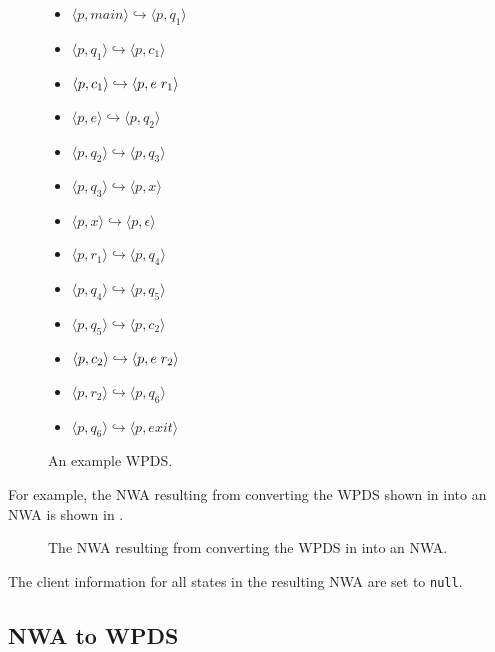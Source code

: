 \begin{figure}[t]
  \centering
    \begin{itemize}
      \centering
      \item{ $\langle p,main \rangle \hookrightarrow \langle p,q_1 \rangle$}
      \item{ $\langle p,q_1 \rangle \hookrightarrow \langle p,c_1 \rangle$}
      \item{ $\langle p,c_1 \rangle \hookrightarrow \langle p,e \hspace{.1cm} r_1 \rangle$}
      \item{ $\langle p,e \rangle \hookrightarrow \langle p,q_2 \rangle$}
      \item{ $\langle p,q_2 \rangle \hookrightarrow \langle p,q_3 \rangle$}
      \item{ $\langle p,q_3 \rangle \hookrightarrow \langle p,x \rangle$}
      \item{ $\langle p,x \rangle \hookrightarrow \langle p,\epsilon \rangle$}
      \item{ $\langle p,r_1 \rangle \hookrightarrow \langle p,q_4 \rangle$}
      \item{ $\langle p,q_4 \rangle \hookrightarrow \langle p,q_5 \rangle$}
      \item{ $\langle p,q_5 \rangle \hookrightarrow \langle p,c_2 \rangle$}
      \item{ $\langle p,c_2 \rangle \hookrightarrow \langle p,e \hspace{.1cm} r_2 \rangle$}
      \item{ $\langle p,r_2 \rangle \hookrightarrow \langle p,q_6 \rangle$}
      \item{ $\langle p,q_6 \rangle \hookrightarrow \langle p,exit \rangle$}
    \end{itemize}
  \caption{An example WPDS.}
  \label{Fi:WpdsToNwa1}
\end{figure}

For example, the NWA resulting from converting the WPDS shown in
 into an NWA is shown in .

\begin{figure}[t]
  \centering
  \caption{The NWA resulting from converting the WPDS in  into an NWA.}
  \label{Fi:WpdsToNwa2}
\end{figure}


The client information for all states in the resulting NWA are set to \texttt{null}.


\subsection{NWA to WPDS}
\label{Se:NWAtoPDS}


